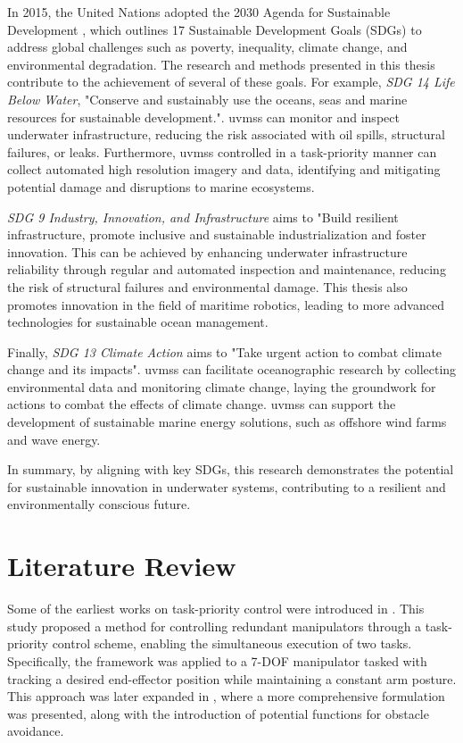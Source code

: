 In 2015, the United Nations adopted the 2030 Agenda for Sustainable Development
\cite{UN2030Agenda}, which outlines 17 Sustainable Development Goals (SDGs) to
address global challenges such as poverty, inequality, climate change, and
environmental degradation. The research and methods presented in this thesis
contribute to the achievement of several of these goals. For example, \emph{SDG 14
Life Below Water}, "Conserve and sustainably use the oceans, seas and marine
resources for sustainable development.". \gls{uvms}s can monitor and inspect underwater
infrastructure, reducing the risk associated with oil spills, structural failures,
or leaks. Furthermore, \gls{uvms}s controlled in a task-priority manner can collect automated
high resolution imagery and data, identifying and mitigating potential
damage and disruptions to marine ecosystems.

\emph{SDG 9 Industry, Innovation, and Infrastructure} aims to "Build resilient
infrastructure, promote inclusive and sustainable industrialization and foster
innovation. This can be achieved by enhancing underwater infrastructure reliability
through regular and automated inspection and maintenance, reducing the risk of
structural failures and environmental damage. This thesis also promotes innovation
in the field of maritime robotics, leading to more advanced technologies for
sustainable ocean management.

Finally, \emph{SDG 13 Climate Action} aims to "Take urgent action to combat climate
change and its impacts". \gls{uvms}s can facilitate oceanographic research by collecting
environmental data and monitoring climate change, laying the groundwork for actions
to combat the effects of climate change. \gls{uvms}s can support the development of
sustainable marine energy solutions, such as offshore wind farms and wave energy.

In summary, by aligning with key SDGs, this research demonstrates the potential
for sustainable innovation in underwater systems, contributing to a resilient 
and environmentally conscious future.

\section{Literature Review}
\label{sec:introduction:literature}

Some of the earliest works on task-priority control were introduced in 
\cite{hanafusa1981}. This study proposed a method for controlling redundant 
manipulators through a task-priority control scheme, enabling the simultaneous 
execution of two tasks. Specifically, the framework was applied to a 7-DOF 
manipulator tasked with tracking a desired end-effector position while 
maintaining a constant arm posture. This approach was later expanded in 
\cite{nakamura1987}, where a more comprehensive formulation was presented, 
along with the introduction of potential functions for obstacle avoidance.

